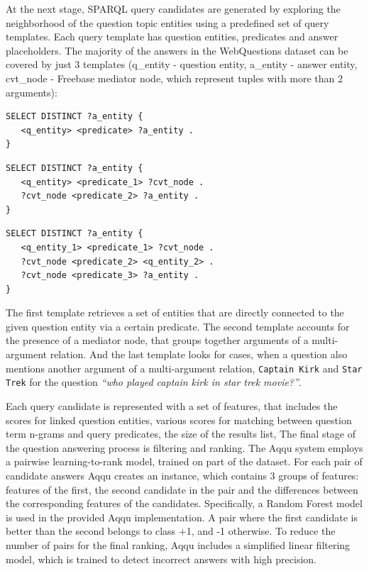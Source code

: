 At the next stage, SPARQL query candidates are generated by exploring the neighborhood of the question topic entities using a predefined set of query templates.
Each query template has question entities, predicates and answer placeholders.
The majority of the answers in the WebQuestions dataset can be covered by just 3 templates (q\_entity - question entity, a\_entity - answer entity, cvt\_node - Freebase mediator node, which represent tuples with more than 2 arguments):
\\

\begin{lstlisting}[frame=single,basicstyle=\small]
SELECT DISTINCT ?a_entity {
   <q_entity> <predicate> ?a_entity .
}
\end{lstlisting}

\vspace{-0.25cm}
\begin{lstlisting}[frame=single,basicstyle=\small]
SELECT DISTINCT ?a_entity {
   <q_entity> <predicate_1> ?cvt_node .
   ?cvt_node <predicate_2> ?a_entity .
}
\end{lstlisting}

\vspace{-0.25cm}
\begin{lstlisting}[frame=single,basicstyle=\small]
SELECT DISTINCT ?a_entity {
   <q_entity_1> <predicate_1> ?cvt_node .
   ?cvt_node <predicate_2> <q_entity_2> .
   ?cvt_node <predicate_3> ?a_entity .
}
\end{lstlisting}

The first template retrieves a set of entities that are directly connected to the given question entity via a certain predicate.
The second template accounts for the presence of a mediator node, that groups together arguments of a multi-argument relation.
And the last template looks for cases, when a question also mentions another argument of a multi-argument relation, \eg \texttt{Captain Kirk} and \texttt{Star Trek} for the question \textit{``who played captain kirk in star trek movie?''}.

Each query candidate is represented with a set of features, that includes the scores for linked question entities, various scores for matching between question term n-grams and query predicates, the size of the results list, \etc
The final stage of the question answering process is filtering and ranking. %
The Aqqu system employs a pairwise learning-to-rank model, trained on part of the dataset.
For each pair of candidate answers Aqqu creates an instance, which contains 3 groups of features: features of the first, the second candidate in the pair and the differences between the corresponding features of the candidates. Specifically, a Random Forest model is used in the provided Aqqu implementation. 
A pair where the first candidate is better than the second belongs to class +1, and -1 otherwise.
To reduce the number of pairs for the final ranking, Aqqu includes a simplified linear filtering model, which is trained to detect incorrect answers with high precision. 

